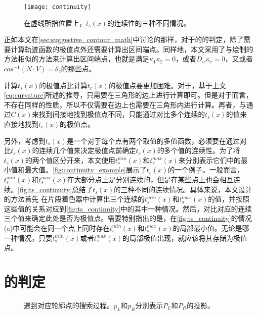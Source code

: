 {\begin{figure}[tbh]
    \centering
    \texttt{[image: continuity]}
    \caption{在虚线所指位置上，$t_s(x)$的连续性的三种不同情况。}
    \label{fig:ts_continuity}
\end{figure}

\label{sec:suggestive_contour_algorithm}

正如本文在\ref{sec:suggestive_contour_math}中讨论的那样，对于\scon{}的\epsl{}的判定，除了需要计算轨迹函数的极值点外还需要计算出区间端点。同样地，本文采用了与绘制\con{}的方法相似的方法来计算出区间端点，也就是满足$\kappa_1\kappa_2 = 0$，或者$D_w\kappa_r = 0$，又或者$cos^{-1}(N\cdot{V}) = \theta_c$的那些点。

计算$t_s(x)$的极值点比计算$t_c(x)$的极值点要更加困难。对于\con{}，基于上文\autoref{eq:curvature}所述的推导，只需要在三角形的边上进行计算即可。但是对于\scon{}而言，不存在同样的性质，所以不仅需要在边上也需要在三角形内进行计算。再者，与通过$C(x)$来找到间接地找到极值点不同，只能通过对比多个连续的$t_s(x)$的值来直接地找到$t_s(x)$的极值点。

另外，考虑到$t_s(x)$是一个对于每个点有两个取值的多值函数，必须要在通过对比$t_s(x)$的连续几个值来决定极值点前确定$t_s(x)$的多个值的连续性。为了将$t_s(x)$的两个值区分开来，本文使用$t_s^{min}(x)$和$t_s^{max}(x)$来分别表示它们中的最小值和最大值。\autoref{fig:continuity_example}展示了$t_s(x)$的一个例子。一般而言，$t_s^{min}(x)$和$t_s^{max}(x)$在大部分点上是分别连续的，但是在某些点上也会相互连续。\autoref{fig:ts_continuity}总结了$t_s(x)$的三种不同的连续情况。具体来说，本文设计的方法首先
在片段着色器中计算出三个连续的$t_s^{min}(x)$和$t_s^{max}(x)$的值，并按照这些值的关系对应到\autoref{fig:ts_continuity}中的其中一种情况。然后，对比对应的连续三个值来确定此处是否为极值点。需要特别指出的是，在\autoref{fig:ts_continuity}的情况(a)中可能会在同一个点上同时存在$t_s^{min}(x)$和$t_s^{max}(x)$的局部最小值。无论是哪一种情况，只要$t_s^{min}(x)$或者$t_s^{max}(x)$的局部极值出现，就应该将其存储为极值点。

\section{\epsl{}的判定}

\begin{figure}[tbh]
    \centering
    \hfil
    \caption{遇到对应轮廓点的搜索过程。$p_L$和$p_R$分别表示$P_L$和$P_R$的投影。}\label{fig:succeed in image space search}
\end{figure}

}
